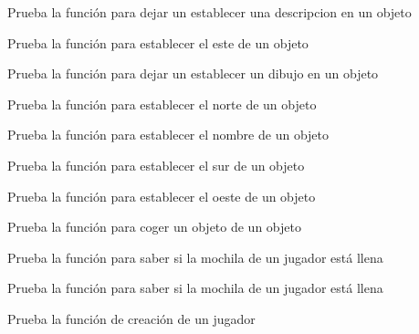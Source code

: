 \begin{DoxyRefList}
\item[\label{test__test000080}%
\Hypertarget{test__test000080}%
Member \hyperlink{object__test_8c_afb26b8c66d332354df8bfd57a8033b8f}{test1\+\_\+object\+\_\+set\+\_\+description} ()]Prueba la función para dejar un establecer una descripcion en un objeto  
\item[\label{test__test000055}%
\Hypertarget{test__test000055}%
Member \hyperlink{object__test_8c_a0da5b8050f929cbcfa8a759a962856f5}{test1\+\_\+object\+\_\+set\+\_\+east} ()]Prueba la función para establecer el este de un objeto  
\item[\label{test__test000076}%
\Hypertarget{test__test000076}%
Member \hyperlink{object__test_8c_ade12664b9bc4400080ba40f8db7105aa}{test1\+\_\+object\+\_\+set\+\_\+gdesc} ()]Prueba la función para dejar un establecer un dibujo en un objeto  
\item[\label{test__test000051}%
\Hypertarget{test__test000051}%
Member \hyperlink{object__test_8c_a6f19ebf6034115c2cdcc3c7bfea25964}{test1\+\_\+object\+\_\+set\+\_\+id} ()]Prueba la función para establecer el norte de un objeto  
\item[\label{test__test000048}%
\Hypertarget{test__test000048}%
Member \hyperlink{object__test_8c_a74e25ad653c4a32b9922fff8e4f916fd}{test1\+\_\+object\+\_\+set\+\_\+name} ()]Prueba la función para establecer el nombre de un objeto  
\item[\label{test__test000053}%
\Hypertarget{test__test000053}%
Member \hyperlink{object__test_8c_a3418e1bc1ae952d49085a68375940ef6}{test1\+\_\+object\+\_\+set\+\_\+south} ()]Prueba la función para establecer el sur de un objeto  
\item[\label{test__test000057}%
\Hypertarget{test__test000057}%
Member \hyperlink{object__test_8c_a7f0c6a44fb6b1010810050f2ea72dc69}{test1\+\_\+object\+\_\+set\+\_\+west} ()]Prueba la función para establecer el oeste de un objeto  
\item[\label{test__test000061}%
\Hypertarget{test__test000061}%
Member \hyperlink{object__test_8c_a8476950bc3a7d77a95a393acec4a9f7a}{test1\+\_\+object\+\_\+take\+\_\+object} ()]Prueba la función para coger un objeto de un objeto  
\item[\label{test__test000225}%
\Hypertarget{test__test000225}%
Member \hyperlink{player__test_8h_acc5358622f284c28d03126605a3c8ad0}{test1\+\_\+player\+\_\+bag\+\_\+is\+\_\+full} ()]Prueba la función para saber si la mochila de un jugador está llena 

Prueba la función para saber si la mochila de un jugador está llena  
\item[\label{test__test000204}%
\Hypertarget{test__test000204}%
Member \hyperlink{player__test_8h_ab29768452373e16bb6aaa1f7998f62fb}{test1\+\_\+player\+\_\+create} ()]Prueba la función de creación de un jugador 


\end{DoxyRefList}
